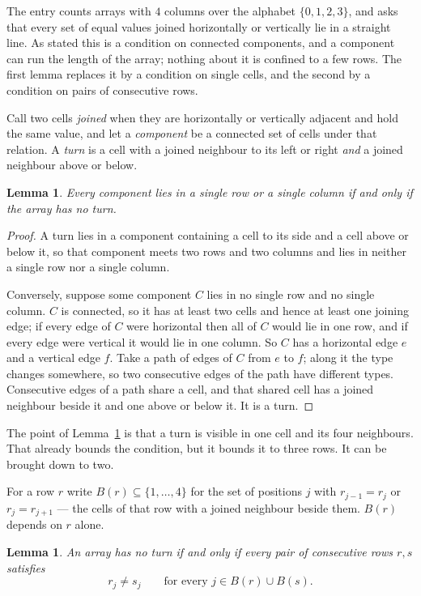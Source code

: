 \documentclass[11pt,a4paper]{article}
\theoremstyle{plain}
\newtheorem{lemma}[theorem]{Lemma}
\theoremstyle{definition}
\begin{document}
The entry counts arrays with $4$ columns over the alphabet $\{0,1,2,3\}$, and asks that every set of equal values joined horizontally or vertically lie in a straight line. As stated this is a condition on connected components, and a component can run the length of the array; nothing about it is confined to a few rows. The first lemma replaces it by a condition on single cells, and the second by a condition on pairs of consecutive rows.

Call two cells \emph{joined} when they are horizontally or vertically adjacent and hold the same value, and let a \emph{component} be a connected set of cells under that relation. A \emph{turn} is a cell with a joined neighbour to its left or right \emph{and} a joined neighbour above or below.

\begin{lemma}\label{lem:turn}
Every component lies in a single row or a single column if and only if the array has no turn.
\end{lemma}

\begin{proof}
A turn lies in a component containing a cell to its side and a cell above or below it, so that component meets two rows and two columns and lies in neither a single row nor a single column.

Conversely, suppose some component $C$ lies in no single row and no single column. $C$ is connected, so it has at least two cells and hence at least one joining edge; if every edge of $C$ were horizontal then all of $C$ would lie in one row, and if every edge were vertical it would lie in one column. So $C$ has a horizontal edge $e$ and a vertical edge $f$. Take a path of edges of $C$ from $e$ to $f$; along it the type changes somewhere, so two consecutive edges of the path have different types. Consecutive edges of a path share a cell, and that shared cell has a joined neighbour beside it and one above or below it. It is a turn.
\end{proof}

The point of Lemma~\ref{lem:turn} is that a turn is visible in one cell and its four neighbours. That already bounds the condition, but it bounds it to three rows. It can be brought down to two.

For a row $r$ write $B(r)\subseteq\{1,\dots,4\}$ for the set of positions $j$ with $r_{j-1}=r_j$ or $r_j=r_{j+1}$ --- the cells of that row with a joined neighbour beside them. $B(r)$ depends on $r$ alone.

\begin{lemma}\label{lem:pair}
An array has no turn if and only if every pair of consecutive rows $r,s$ satisfies
\[ r_j \neq s_j \qquad\text{for every } j \in B(r)\cup B(s). \]
\end{lemma}
\end{document}

